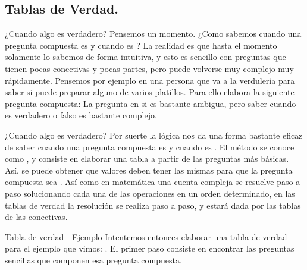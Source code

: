 \subsection{Tablas de Verdad.}


\begin{frame}{¿Cuando algo es verdadero?}
  Pensemos un momento. ¿Como sabemos cuando una pregunta compuesta es
  \fulltrue y cuando es \fullfalse?
  \jump
  La realidad es que hasta el momento solamente lo sabemos de forma intuitiva,
  y esto es sencillo con preguntas que tienen pocas conectivas y pocas partes,
  pero puede volverse muy complejo muy rápidamente.
  \jump
  Pensemos por ejemplo en una persona que va a la verdulería para saber si
  puede preparar alguno de varios platillos. Para ello elabora la siguiente
  pregunta compuesta:
  \jump
  \jump
  La pregunta en si es bastante ambigua, pero saber cuando es verdadero o falso
  es bastante complejo.
\end{frame}


\begin{frame}{¿Cuando algo es verdadero?}
  Por suerte la lógica nos da una forma bastante eficaz de saber cuando
  una pregunta compuesta es \fulltrue y cuando es \fullfalse.
  \jump
  El método se conoce como , y consiste
  en elaborar una tabla a partir de las preguntas más básicas. Así, se puede
  obtener que valores deben tener las mismas para que la pregunta compuesta
  sea \fulltrue.
  \jump
  Así como en matemática una cuenta compleja se resuelve paso a paso solucionando
  cada una de las operaciones en un orden determinado, en las tablas de verdad
  la resolución se realiza paso a paso, y estará dada por las tablas de las
  conectivas.
\end{frame}


\begin{frame}{Tabla de verdad - Ejemplo}
  Intentemos entonces elaborar una tabla de verdad para el ejemplo que vimos:
  .
  \jump
  El primer paso consiste en encontrar las preguntas sencillas que componen esa
  pregunta compuesta.
\end{frame}

